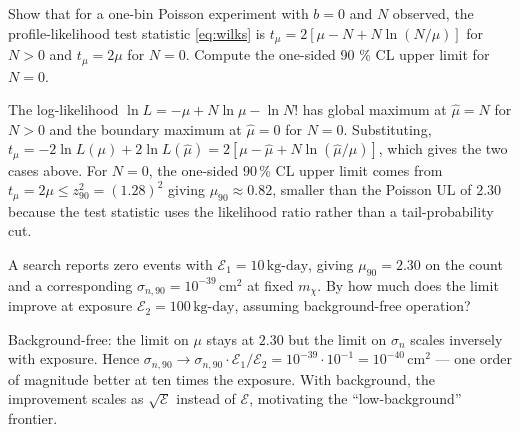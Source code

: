 \begin{exercise}[Profile-likelihood limit, $b=0$]
Show that for a one-bin Poisson experiment with $b=0$ and $N$
observed, the profile-likelihood test statistic
\cref{eq:wilks} is
$t_\mu=2[\mu-N+N\ln(N/\mu)]$ for $N>0$ and $t_\mu=2\mu$ for $N=0$.
Compute the one-sided 90 \% CL upper limit for $N=0$.
\begin{solution}
The log-likelihood $\ln L=-\mu+N\ln\mu-\ln N!$ has global maximum
at $\hat\mu=N$ for $N>0$ and the boundary maximum at $\hat\mu=0$
for $N=0$. Substituting,
$t_\mu=-2\ln L(\mu)+2\ln L(\hat\mu)=2[\mu-\hat\mu+N\ln(\hat\mu/\mu)]$,
which gives the two cases above. For $N=0$, the one-sided 90\,\%
CL upper limit comes from $t_\mu= 2\mu \leq z_{90}^2 = (1.28)^2$
giving $\mu_{90}\approx 0.82$, smaller than the Poisson UL of
$2.30$ because the test statistic uses the likelihood ratio rather
than a tail-probability cut.
\end{solution}
\end{exercise}

\begin{exercise}
A search reports zero events with $\mathcal E_1=10\,\text{kg-day}$,
giving $\mu_{90}=2.30$ on the count and a corresponding
$\sigma_{n,90}=10^{-39}\,\text{cm}^2$ at fixed $m_\chi$. By how
much does the limit improve at exposure
$\mathcal E_2=100\,\text{kg-day}$, assuming background-free
operation?
\begin{solution}
Background-free: the limit on $\mu$ stays at $2.30$ but the
limit on $\sigma_n$ scales inversely with exposure. Hence
$\sigma_{n,90}\to\sigma_{n,90}\cdot\mathcal E_1/\mathcal E_2=10^{-39}\cdot 10^{-1}
=10^{-40}\,\text{cm}^2$ --- one order of magnitude better at ten
times the exposure. With background, the improvement scales as
$\sqrt{\mathcal E}$ instead of $\mathcal E$, motivating the
``low-background'' frontier.
\end{solution}
\end{exercise}

